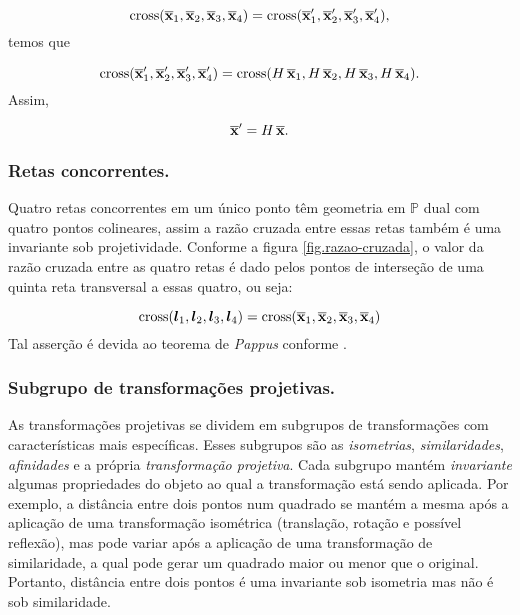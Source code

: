 \begin{equation*}
\text{cross}(\overline{\mathbf{x}}_1,\overline{\mathbf{x}}_2,\overline{\mathbf{x}}_3,\overline{\mathbf{x}}_4)=\text{cross}(\overline{\mathbf{x}}'_1,\overline{\mathbf{x}}'_2,\overline{\mathbf{x}}'_3,\overline{\mathbf{x}}'_4),
\end{equation*}
temos que

\begin{equation*}
\text{cross}(\overline{\mathbf{x}}'_1,\overline{\mathbf{x}}'_2,\overline{\mathbf{x}}'_3,\overline{\mathbf{x}}'_4)=\text{cross}(H\,\overline{\mathbf{x}}_1,H\,\overline{\mathbf{x}}_2,H\,\overline{\mathbf{x}}_3,H\,\overline{\mathbf{x}}_4).
\end{equation*}
Assim,

\begin{equation*}
\overline{\mathbf{x}}'=H\,\overline{\mathbf{x}}.
\end{equation*}







\subsubsection*{Retas concorrentes.}
Quatro retas concorrentes em um único ponto têm geometria em ${\mathbb{P}}$ dual com quatro pontos colineares, assim a razão cruzada entre essas retas também é uma invariante sob projetividade. Conforme a figura \ref{fig.razao-cruzada}, o valor da razão cruzada entre as quatro retas é dado pelos pontos de interseção de uma quinta reta transversal a essas quatro, ou seja:

\begin{equation*}
\text{cross}(\boldsymbol{l}_1,\boldsymbol{l}_2,\boldsymbol{l}_3,\boldsymbol{l}_4)=\text{cross}(\overline{\mathbf{x}}_1,\overline{\mathbf{x}}_2,\overline{\mathbf{x}}_3,\overline{\mathbf{x}}_4)
\end{equation*}
Tal asserção é devida ao teorema de \textit{Pappus} conforme \citep{springer64}. 



\subsubsection{Subgrupo de transformações projetivas.}\label{sec.hierarquia-transformacoes}

As transformações projetivas se dividem em subgrupos de transformações com características mais específicas. Esses subgrupos são as \textit{isometrias}, \textit{similaridades}, \textit{afinidades} e a própria \textit{transformação projetiva}. Cada subgrupo mantém \textit{invariante} algumas propriedades do objeto ao qual a transformação está sendo aplicada. Por exemplo, a distância entre dois pontos num quadrado se mantém a mesma após a aplicação de uma transformação isométrica (translação, rotação e possível reflexão), mas pode variar após a aplicação de uma transformação de similaridade, a qual pode gerar um quadrado maior ou menor que o original. Portanto, distância entre dois pontos é uma invariante sob isometria mas não é sob similaridade.

